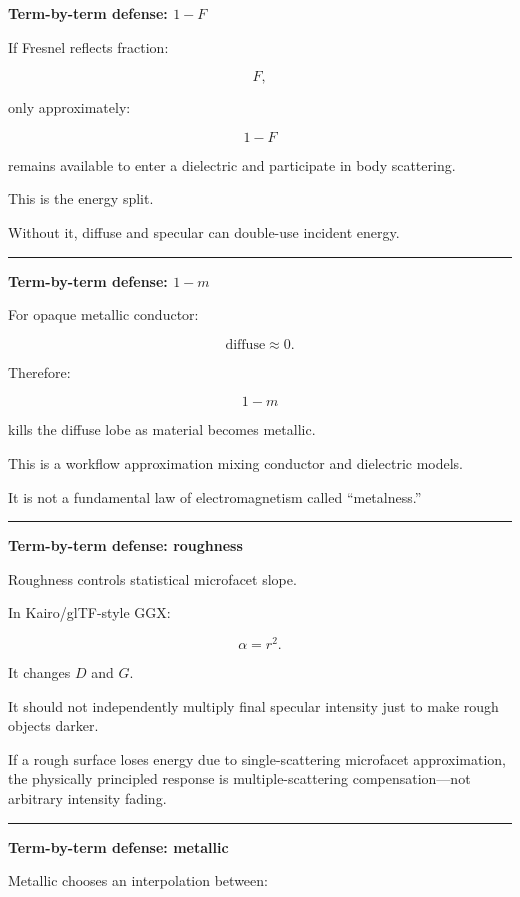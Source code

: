 \textbf{Term-by-term defense: \(1-F\)}

If Fresnel reflects fraction:

\[
F,
\]

only approximately:

\[
1-F
\]

remains available to enter a dielectric and participate in body scattering.

This is the energy split.

Without it, diffuse and specular can double-use incident energy.

\begin{center}\rule{0.5\linewidth}{0.5pt}\end{center}

\textbf{Term-by-term defense: \(1-m\)}

For opaque metallic conductor:

\[
\text{diffuse}\approx0.
\]

Therefore:

\[
1-m
\]

kills the diffuse lobe as material becomes metallic.

This is a workflow approximation mixing conductor and dielectric models.

It is not a fundamental law of electromagnetism called ``metalness.''

\begin{center}\rule{0.5\linewidth}{0.5pt}\end{center}

\textbf{Term-by-term defense: roughness}

Roughness controls statistical microfacet slope.

In Kairo/glTF-style GGX:

\[
\alpha=r^2.
\]

It changes \(D\) and \(G\).

It should not independently multiply final specular intensity just to make rough objects darker.

If a rough surface loses energy due to single-scattering microfacet approximation, the physically principled response is multiple-scattering compensation---not arbitrary intensity fading.

\begin{center}\rule{0.5\linewidth}{0.5pt}\end{center}

\textbf{Term-by-term defense: metallic}

Metallic chooses an interpolation between:

